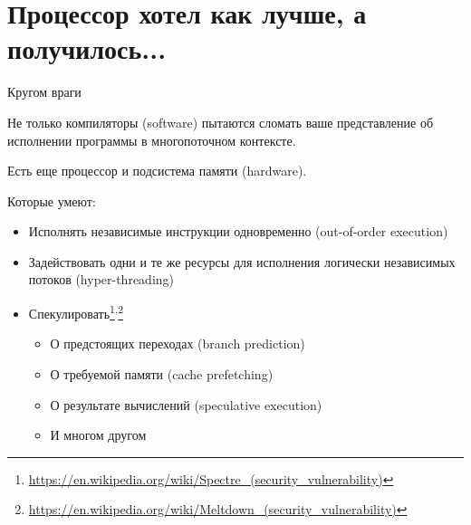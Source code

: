 
\section{Процессор хотел как лучше, а получилось...}
\showTOC

\begin{frame}{Кругом враги}

Не только компиляторы (software) пытаются сломать ваше представление об исполнении программы в многопоточном контексте. 

\pause
Есть еще процессор и подсистема памяти (hardware). 

\pause
Которые умеют:
\begin{itemize}
    \pause
    \item Исполнять независимые инструкции одновременно (out-of-order execution)

    \pause
    \item Задействовать одни и те же ресурсы для исполнения логически независимых потоков (hyper-threading)

    \pause
    \item Спекулировать\footnote<6->{\tiny\url{https://en.wikipedia.org/wiki/Spectre_(security_vulnerability)}}\textsuperscript{,}\footnote<6->{\tiny\url{https://en.wikipedia.org/wiki/Meltdown_(security_vulnerability)}}
    \begin{itemize}
        \pause
        \item О предстоящих переходах (branch prediction)

        \pause
        \item О требуемой памяти (cache prefetching)

        \pause
        \item О результате вычислений (speculative execution)

        \pause
        \item И многом другом
    \end{itemize}
\end{itemize}

\end{frame}

